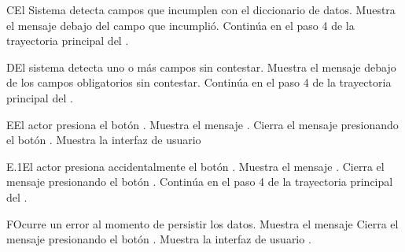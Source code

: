 \begin{UCtrayectoriaA}{C}{El Sistema detecta campos que incumplen con el diccionario de datos.}
    \UCpaso Muestra el mensaje  debajo del campo que incumplió.
    \UCpaso Continúa en el paso 4 de la trayectoria principal del .
\end{UCtrayectoriaA}
\begin{UCtrayectoriaA}{D}{El sistema detecta uno o más campos sin contestar.}
    \UCpaso Muestra el mensaje  debajo de los campos obligatorios sin contestar.
    \UCpaso Continúa en el paso 4 de la trayectoria principal del .
\end{UCtrayectoriaA}
\begin{UCtrayectoriaA}{E}{El actor presiona el botón .}
    \UCpaso Muestra el mensaje .
    \UCpaso[\UCactor] Cierra el mensaje presionando el botón .
    \UCpaso Muestra la interfaz de usuario 
\end{UCtrayectoriaA}
\begin{UCtrayectoriaA}{E.1}{El actor presiona accidentalmente el botón .}
    \UCpaso Muestra el mensaje .
    \UCpaso[\UCactor] Cierra el mensaje presionando el botón .
    \UCpaso Continúa en el paso 4 de la trayectoria principal del .
\end{UCtrayectoriaA}
\begin{UCtrayectoriaA}{F}{Ocurre un error al momento de persistir los datos.}
    \UCpaso Muestra el mensaje 
    \UCpaso[\UCactor] Cierra el mensaje presionando el botón .
    \UCpaso Muestra la interfaz de usuario .
\end{UCtrayectoriaA}
